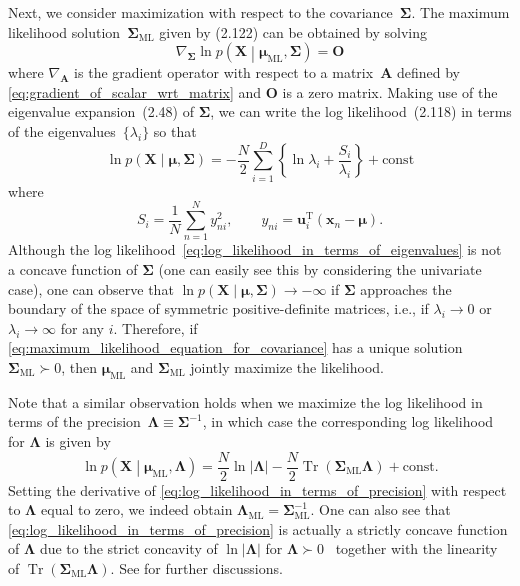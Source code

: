 \documentclass[12pt,a4paper]{article}
\begin{document}
Next, we consider maximization with respect to the covariance~$\bm{\Sigma}$.
The maximum likelihood solution~$\bm{\Sigma}_\text{ML}$ given by (2.122) can be obtained by solving
\begin{equation}
\nabla_{\bm{\Sigma}} \ln p\left(\mathbf{X}\middle| \bm{\mu}_\text{ML}, \bm{\Sigma}\right)
= \mathbf{O}
\label{eq:maximum_likelihood_equation_for_covariance}
\end{equation}
where $\nabla_{\mathbf{A}}$ is the gradient operator with respect to a matrix~$\mathbf{A}$
defined by \eqref{eq:gradient_of_scalar_wrt_matrix} and
$\mathbf{O}$ is a zero matrix.
Making use of the eigenvalue expansion~(2.48) of $\bm{\Sigma}$,
we can write the log likelihood~(2.118) in terms of the eigenvalues~$\{\lambda_i\}$ so that
\begin{equation}
\ln p\left(\mathbf{X}\middle| \bm{\mu}, \bm{\Sigma}\right) =
-\frac{N}{2} \sum_{i=1}^{D} \left\{
\ln \lambda_i
+ \frac{S_i}{\lambda_i}
\right\}
+ \text{const}
\label{eq:log_likelihood_in_terms_of_eigenvalues}
\end{equation}
where
\begin{equation}
S_{i} = \frac{1}{N} \sum_{n=1}^{N} y_{ni}^{2}, \qquad
y_{ni} = \mathbf{u}_{i}^{\operatorname{T}}\left(\mathbf{x}_n - \bm{\mu}\right) .
\end{equation}
Although the log likelihood~\eqref{eq:log_likelihood_in_terms_of_eigenvalues} is
not a concave function of $\bm{\Sigma}$
(one can easily see this by considering the univariate case),
one can observe that $\ln p\left(\mathbf{X}\middle| \bm{\mu}, \bm{\Sigma}\right) \to -\infty$
if $\bm{\Sigma}$ approaches the boundary of the space of symmetric positive-definite matrices,
i.e., if $\lambda_i \to 0$ or $\lambda_i \to \infty$ for any $i$.
Therefore, if \eqref{eq:maximum_likelihood_equation_for_covariance}
has a unique solution~$\bm{\Sigma}_\text{ML} \succ 0$,
then $\bm{\mu}_\text{ML}$ and $\bm{\Sigma}_\text{ML}$ jointly maximize the likelihood.

Note that a similar observation holds when we maximize the log likelihood in terms of
the precision~$\bm{\Lambda} \equiv \bm{\Sigma}^{-1}$,
in which case the corresponding log likelihood for $\bm{\Lambda}$ is given by
\begin{equation}
\ln p\left(\mathbf{X}\middle|\bm{\mu}_\text{ML}, \bm{\Lambda}\right)
= \frac{N}{2} \ln\left|\bm{\Lambda}\right|
- \frac{N}{2}\operatorname{Tr}\left(\bm{\Sigma}_\text{ML} \bm{\Lambda}\right)
+ \text{const} .
\label{eq:log_likelihood_in_terms_of_precision}
\end{equation}
Setting the derivative of \eqref{eq:log_likelihood_in_terms_of_precision}
with respect to $\bm{\Lambda}$ equal to zero,
we indeed obtain $\bm{\Lambda}_\text{ML} = \bm{\Sigma}_\text{ML}^{-1}$.
One can also see that \eqref{eq:log_likelihood_in_terms_of_precision} is actually
a strictly concave function of $\bm{\Lambda}$
due to the strict concavity of $\ln\left|\bm{\Lambda}\right|$
for $\bm{\Lambda} \succ 0$~\citep{MagnusNeudecker:MDC}
together with the linearity of $\operatorname{Tr}\left(\bm{\Sigma}_\text{ML} \bm{\Lambda}\right)$.
See \citet{Anderson:MaximumLikelihood} for further discussions.
\end{document}
